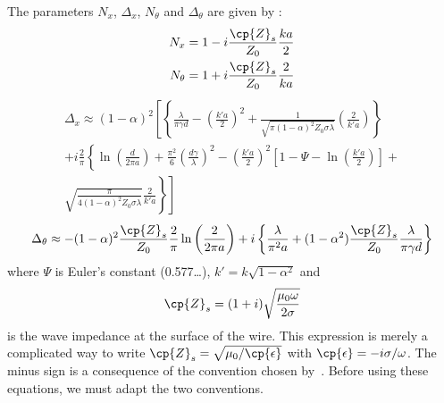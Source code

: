 \begin{refsection}
The parameters $N_x$, $\Delta_x$, $N_\theta$ and $\Delta_\theta$ are given by \textcite{houde_2001}:
\begin{align}
    N_x
    &=
    1 - i \frac{\cp{Z}_s}{Z_0} \frac{ka}{2}
    \\
    N_\theta
    &=
    1 + i \frac{\cp{Z}_s}{Z_0} \frac{2}{ka}
\end{align}
\begin{multline}
    \Delta_x \approx
    (1-\alpha)^2
    \left[
        \left\lbrace
            \frac{\lambda}{\pi \gamma d}
            -
            \left(
                \frac{k'a}{2}
            \right)^2
            +
            \frac{
                1
            }{
                \sqrt{
                    \pi
                    (1 - \alpha)^2
                    Z_0
                    \sigma
                    \lambda
                }
            }
            \left(
                \frac{2}{k'a}
            \right)
        \right\rbrace
    \right.
    \\
        +i \frac{2}{\pi}
        \left\lbrace
            \ln \left( \frac{d}{2\pi a} \right)
            +
            \frac{\pi^2}{6}
            \left(
                \frac{d \gamma}{\lambda}
            \right)^2
            -
            \left(
                \frac{k'a}{2}
            \right)^2
            \left[
                1 - \Psi - \ln\left( \frac{k'a}{2} \right)
            \right]
        \right.
            +
    \\
    \left.
        \left.
            \sqrt{
                \frac{\pi}{
                    4
                    (1-\alpha)^2
                    Z_0
                    \sigma
                    \lambda
                }
            }
            \frac{2}{k'a}
        \right\rbrace
    \right]
\end{multline}
\begin{equation}
    \Delta_\theta
    \approx
    -(1-\alpha)^2
    \frac{\cp{Z}_s}{Z_0}
    \frac{2}{\pi}
    \ln \left(
        \frac{2}{2\pi a}
    \right)
    +
    i
    \left\lbrace
        \frac{\lambda}{\pi^2 a}
        +
        (1-\alpha^2)
        \frac{\cp{Z}_s}{Z_0}
        \frac{\lambda}{\pi \gamma d}
    \right\rbrace
\end{equation}
where $\Psi$ is Euler's constant (\num{0.577}\dots), $k'= k \sqrt{1-\alpha^2}$ and
\begin{equation}
    \cp{Z}_s = (1 + i) \sqrt{\frac{\mu_0 \omega}{2 \sigma}}
\end{equation}
is the wave impedance at the surface of the wire.
This expression is merely a complicated way to write
$\cp{Z}_s = \sqrt{\mu_0 / \cp{\epsilon}}$ with $\cp{\epsilon}=-i \sigma / \omega$.
The minus sign is a consequence of the convention chosen by~\citeauthor{houde_2001}.
Before using these equations, we must adapt the two conventions.


\end{refsection}
